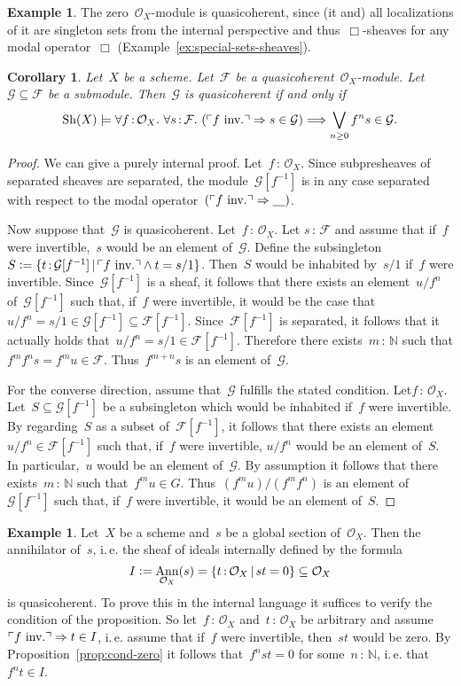 \documentclass[10pt]{amsart}
\makeatletter
\theoremstyle{definition}
\newtheorem{ex}[defn]{Example}
\theoremstyle{plain}
\newtheorem{cor}[defn]{Corollary}
\theoremstyle{remark}
\newcommand{\F}{\mathcal{F}}
\renewcommand{\G}{\mathcal{G}}
\renewcommand{\O}{\mathcal{O}}
\newcommand{\NN}{\mathbb{N}}
\newcommand{\placeholder}{\underline{\quad}}
\newcommand{\Sh}{\mathrm{Sh}}
\DeclareMathOperator{\Ann}{Ann}
\newcommand{\?}{\,{:}\,}
\renewcommand{\_}{\mathpunct{.}\,}
\newcommand{\speak}[1]{\ulcorner\text{\textnormal{#1}}\urcorner}
\newcommand{\ie}{i.\,e.\@\xspace}
\newcommand{\inv}{inv.\@}
\newcommand{\defeq}{\vcentcolon=}
\makeatother
\begin{document}
\begin{ex}The zero~$\O_X$-module is quasicoherent, since (it and) all
localizations of it are singleton sets from the internal perspective and
thus~$\Box$-sheaves for any modal operator~$\Box$
(Example~\ref{ex:special-sets-sheaves}).\end{ex}

\begin{cor}Let~$X$ be a scheme. Let~$\F$ be a quasicoherent~$\O_X$-module.
Let~$\G \subseteq \F$ be a submodule. Then~$\G$ is quasicoherent if and only
if
\[ \Sh(X) \models \forall f\?\O_X\_
  \forall s\?\F\_
  (\speak{$f$ \inv} \Rightarrow s \in \G) \Longrightarrow
  \bigvee_{n \geq 0} f^n s \in \G. \]
\end{cor}
\begin{proof}We can give a purely internal proof. Let~$f\?\O_X$.
Since subpresheaves of separated sheaves are separated, the module~$\G[f^{-1}]$
is in any case separated with respect to the modal operator~$(\speak{$f$ \inv}
\Rightarrow \placeholder)$.

Now suppose that~$\G$ is quasicoherent. Let~$f\?\O_X$. Let $s\?\F$ and assume that
if~$f$ were invertible,~$s$ would be an element of~$\G$. Define the
subsingleton~$S \defeq \{ t\?\G[f^{-1}] \,|\, \speak{$f$ \inv} \wedge t=s/1 \}$.
Then~$S$ would be inhabited by~$s/1$ if~$f$ were invertible. Since~$\G[f^{-1}]$
is a sheaf, it follows that there exists an element~$u/f^n$ of~$\G[f^{-1}]$
such that, if~$f$ were invertible, it would be the case that~$u/f^n = s/1 \in
\G[f^{-1}] \subseteq \F[f^{-1}]$.
Since~$\F[f^{-1}]$ is separated, it follows that it actually holds that~$u/f^n
= s/1 \in \F[f^{-1}]$. Therefore there exists~$m\?\NN$ such that $f^m f^n s =
f^m u \in \F$. Thus~$f^{m+n} s$ is an element of~$\G$.

For the converse direction, assume that~$\G$ fulfills the stated condition.
Let$f\?\O_X$. Let~$S \subseteq \G[f^{-1}]$ be a subsingleton which would be
inhabited if~$f$ were invertible. By regarding~$S$ as a subset of~$\F[f^{-1}]$,
it follows that there exists an element~$u/f^n \in \F[f^{-1}]$ such that,
if~$f$ were invertible, $u/f^n$ would be an element of~$S$. In particular,~$u$
would be an element of~$\G$. By assumption
it follows that there exists~$m\?\NN$ such that~$f^m u \in G$. Thus~$(f^m u) /
(f^m f^n)$ is an element of~$\G[f^{-1}]$ such that, if~$f$ were invertible, it
would be an element of~$S$.
\end{proof}

\begin{ex}\label{ex:annihilator-qcoh}
Let~$X$ be a scheme and~$s$ be a global section of~$\O_X$. Then the
annihilator of~$s$, \ie the sheaf of ideals internally defined by the
formula
\[ I \defeq \Ann_{\O_X}(s) = \{ t\?\O_X \,|\, st = 0 \} \subseteq \O_X \]
is quasicoherent. To prove this in the internal language it suffices to
verify the condition of the proposition.
So let~$f\?\O_X$ and~$t\?\O_X$ be arbitrary and assume~$\speak{$f$ \inv} \Rightarrow t \in I$,
\ie assume that if~$f$ were invertible, then~$st$ would be zero. By
Proposition~\ref{prop:cond-zero} it follows that~$f^n st = 0$ for
some~$n\?\NN$, \ie that~$f^n t \in I$.
\end{ex}
\end{document}
